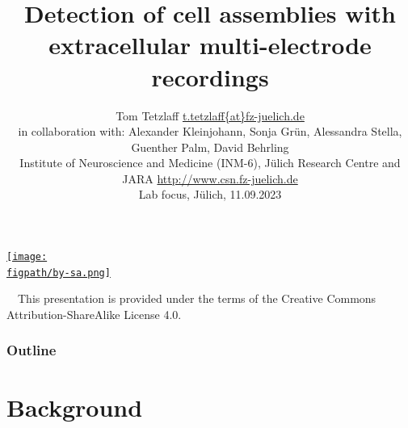 \documentclass[8pt,t,usepdftitle=false]{beamer}
\title{%
  {\Large\bf Detection of cell assemblies with extracellular multi-electrode recordings}\\[1ex]
}
\subtitle{%
  {\normalsize\mdseries Tom Tetzlaff}%
  {\hfill\tiny\url{t.tetzlaff{at}fz-juelich.de}}\\
  {\small\mdseries in collaboration with: Alexander Kleinjohann, Sonja Gr\"un, Alessandra Stella, Guenther Palm, David Behrling}\\
  {\footnotesize\mdseries Institute of Neuroscience and Medicine (INM-6), J\"ulich Research Centre and JARA}
  {\hfill\tiny\url{http://www.csn.fz-juelich.de}}
  \\
  {\tiny\mdseries Lab focus, J\"ulich, 11.09.2023}
}
\date{}
\author{}
\institute{}
\def\figpath{./figures}
\begin{document}
\maketitle
\begin{frame}[plain]
  \begin{center}
    \parbox{0.9\linewidth}{
      \vspace{0.95\textheight}
      \parbox[c]{0.1\linewidth}{%
        \href{https://creativecommons.org/licenses/by-sa/4.0}{%
          \texttt{[image: \\figpath/by-sa.png]}}}
      \parbox[c]{0.9\linewidth}{\scriptsize%
        ~~{}This presentation is provided under the terms of the Creative Commons Attribution-ShareAlike License 4.0.
      }
    }    
  \end{center}
\end{frame}
\def\ttl{Outline}
\begin{frame}[plain]
  \frametitle{\ttl}
  \tableofcontents
\end{frame}
\def\ttl{Background}
\section{\ttl}
\def\sttl{Cell assemblies}
\end{document}
